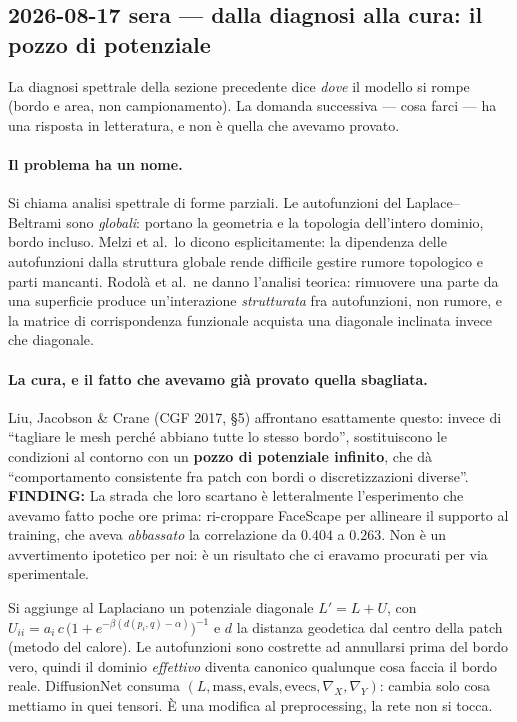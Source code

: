 \documentclass[11pt,a4paper]{article}
\newcommand{\finding}[1]{\textcolor{finding}{\textbf{FINDING:}} #1}
\begin{document}
\subsection{2026-08-17 sera --- dalla diagnosi alla cura: il pozzo di potenziale}

La diagnosi spettrale della sezione precedente dice \emph{dove} il modello si rompe (bordo e
area, non campionamento). La domanda successiva --- cosa farci --- ha una risposta in
letteratura, e non \`e quella che avevamo provato.

\paragraph{Il problema ha un nome.}
Si chiama analisi spettrale di forme parziali. Le autofunzioni del Laplace--Beltrami sono
\emph{globali}: portano la geometria e la topologia dell'intero dominio, bordo incluso.
Melzi et al.\ lo dicono esplicitamente: la dipendenza delle autofunzioni dalla struttura
globale rende difficile gestire rumore topologico e parti mancanti. Rodol\`a et al.\ ne danno
l'analisi teorica: rimuovere una parte da una superficie produce un'interazione
\emph{strutturata} fra autofunzioni, non rumore, e la matrice di corrispondenza funzionale
acquista una diagonale inclinata invece che diagonale.

\paragraph{La cura, e il fatto che avevamo gi\`a provato quella sbagliata.}
Liu, Jacobson \& Crane (CGF 2017, \S5) affrontano esattamente questo: invece di ``tagliare le
mesh perch\'e abbiano tutte lo stesso bordo'', sostituiscono le condizioni al contorno con un
\textbf{pozzo di potenziale infinito}, che d\`a ``comportamento consistente fra patch con bordi
o discretizzazioni diverse''.
\finding{La strada che loro scartano \`e letteralmente l'esperimento che avevamo fatto poche ore
prima: ri-croppare FaceScape per allineare il supporto al training, che aveva \emph{abbassato}
la correlazione da $0.404$ a $0.263$. Non \`e un avvertimento ipotetico per noi: \`e un
risultato che ci eravamo procurati per via sperimentale.}

Si aggiunge al Laplaciano un potenziale diagonale
$L' = L + U$, con $U_{ii} = a_i\,c\,\big(1+e^{-\beta(d(p_i,q)-\alpha)}\big)^{-1}$ e $d$ la
distanza geodetica dal centro della patch (metodo del calore). Le autofunzioni sono costrette
ad annullarsi prima del bordo vero, quindi il dominio \emph{effettivo} diventa canonico
qualunque cosa faccia il bordo reale. DiffusionNet consuma
$(L, \text{mass}, \text{evals}, \text{evecs}, \nabla_X, \nabla_Y)$: cambia solo cosa mettiamo
in quei tensori. \`E una modifica al preprocessing, la rete non si tocca.
\end{document}

